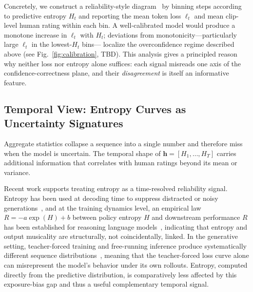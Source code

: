 \documentclass{article}
\begin{document}
Concretely, we construct a reliability-style
diagram~\cite{guo2017calibration}
by binning steps according to predictive entropy $H_t$
and reporting the mean token loss $\ell_t$
and mean clip-level human rating within each bin.
A well-calibrated model would produce a monotone increase in $\ell_t$ with $H_t$;
deviations from monotonicity---particularly large $\ell_t$ in the lowest-$H_t$ bins---%
localize the overconfidence regime described above
(see Fig.~\ref{fig:calibration}, TBD).
This analysis gives a principled reason why neither loss nor entropy alone suffices:
each signal misreads one axis of the confidence-correctness plane,
and their \emph{disagreement} is itself an informative feature.

\subsection{Temporal View: Entropy Curves as Uncertainty Signatures}
\label{subsec:temporal}

Aggregate statistics collapse a sequence into a single number
and therefore miss when the model is uncertain.
The temporal shape of $\mathbf{h}=[H_1,\ldots,H_T]$
carries additional information that correlates with human ratings
beyond its mean or variance.

Recent work supports treating entropy as a time-resolved reliability signal.
Entropy has been used at decoding time to suppress distracted
or noisy generations~\cite{qiu2024entropy},
and at the training dynamics level,
an empirical law $R=-a\exp(H)+b$ between policy entropy $H$
and downstream performance $R$ has been established
for reasoning language models~\cite{cui2025entropy},
indicating that entropy and output musicality are structurally,
not coincidentally, linked.
In the generative setting, teacher-forced training
and free-running inference produce systematically different
sequence distributions~\cite{wiseman2016sequence},
meaning that the teacher-forced loss curve alone
can misrepresent the model's behavior under its own rollouts.
Entropy, computed directly from the predictive distribution,
is comparatively less affected by this exposure-bias gap
and thus a useful complementary temporal signal.
\end{document}
